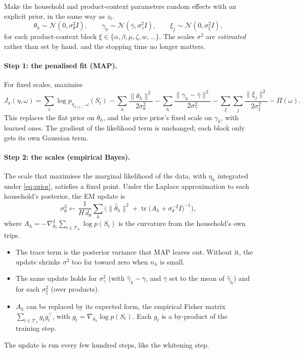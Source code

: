 \documentclass[11pt]{article}
\theoremstyle{remark}\newtheorem{remark}{Remark}
\newcommand{\N}{\mathcal{N}}
\begin{document}
Make the household and product-context parameters random effects with an explicit prior, in the
same way as $z_t$.
\begin{equation}\label{eq:prior}
\theta_h\sim\N(0,\sigma_\theta^2 I),\qquad \gamma_h\sim\N(\bar\gamma,\sigma_\gamma^2 I),\qquad
\xi_j\sim\N(0,\sigma_\xi^2 I),
\end{equation}
for each product-context block $\xi\in\{\alpha,\beta,\mu,\zeta,w,\dots\}$.
The scales $\sigma^2$ are \emph{estimated} rather than set by hand, and the stopping time no longer
matters.

\paragraph{Step 1: the penalised fit (MAP).} For fixed scales, maximise
\begin{equation}\label{eq:map}
J_\sigma(\eta,\omega)=\sum_t\log p_{\eta_{h(t)},\omega}(S_t)-\sum_h\frac{\lVert\theta_h\rVert^2}{2\sigma_\theta^2}
-\sum_h\frac{\lVert\gamma_h-\bar\gamma\rVert^2}{2\sigma_\gamma^2}-\sum_{\xi}\sum_j\frac{\lVert\xi_j\rVert^2}{2\sigma_\xi^2}-\Pi(\omega).
\end{equation}
This replaces the flat prior on $\theta_h$, and the price prior's fixed scale on $\gamma_h$, with
learned ones. The gradient of the likelihood term is unchanged; each block only gets its own
Gaussian term.

\paragraph{Step 2: the scales (empirical Bayes).} The scale that maximises the marginal likelihood
of the data, with $\eta_h$ integrated under \eqref{eq:prior}, satisfies a fixed point. Under the
Laplace approximation to each household's posterior, the EM update is
\begin{equation}\label{eq:em}
\sigma_\theta^2\leftarrow\frac{1}{H\,d_\theta}\sum_h\Big(\lVert\hat\theta_h\rVert^2+\operatorname{tr}\big(A_h+\sigma_\theta^{-2}I\big)^{-1}\Big),
\end{equation}
where $A_h=-\nabla^2_{\theta_h}\sum_{t\in\mathcal T_h}\log p(S_t)$ is the curvature from the household's own trips.
\begin{itemize}
\item The trace term is the posterior variance that MAP leaves out. Without it, the update
  shrinks $\sigma^2$ too far toward zero when $n_h$ is small.
\item The same update holds for $\sigma_\gamma^2$ (with $\hat\gamma_h-\bar\gamma$, and $\bar\gamma$
  set to the mean of $\hat\gamma_h$) and for each $\sigma_\xi^2$ (over products).
\item $A_h$ can be replaced by its expected form, the empirical Fisher matrix
  $\sum_{t\in\mathcal T_h}g_tg_t^\top$, with $g_t=\nabla_{\theta_h}\log p(S_t)$. Each $g_t$ is a
  by-product of the training step.
\end{itemize}
The update is run every few hundred steps, like the whitening step.
\end{document}
